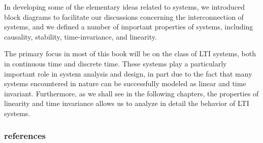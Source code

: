 \documentclass[koma,utopia,letterpaper,captions=tableheading,11pt,listings-sv,microtype,paralist,colorlinks=true,urlcolor=blue]{org-article}
\begin{document}
In developing some of the elementary ideas related to systems, we introduced
block diagrams to facilitate our discussions concerning the interconnection of
systems, and we defined a number of important properties of systems, including
causality, stability, time-invariance, and linearity.

The primary focus in most of this book will be on the class of LTI systems, both
in continuous time and discrete time. These systems play a particularly
important role in system analysis and design, in part due to the fact that many
systems encountered in nature can be successfully modeled as linear and time
invariant. Furthermore, as we shall see in the following chapters, the
properties of linearity and time invariance allows us to analyze in detail the
behavior of LTI systems.

\subsubsection{references}
\label{sec:org63c4515}
\end{document}
